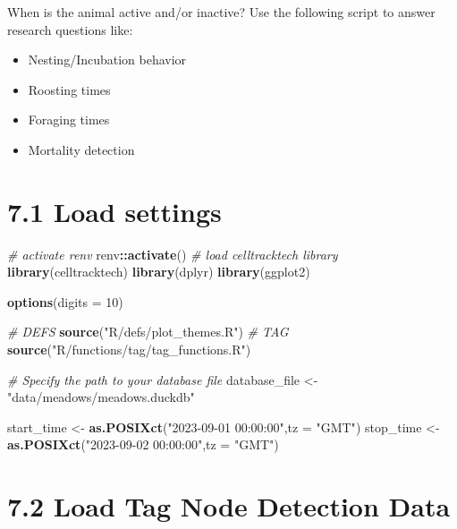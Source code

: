 \documentclass[
]{book}
\newenvironment{Shaded}{\begin{snugshade}}{\end{snugshade}}
\newcommand{\AttributeTok}[1]{\textcolor[rgb]{0.13,0.29,0.53}{#1}}
\newcommand{\CommentTok}[1]{\textcolor[rgb]{0.56,0.35,0.01}{\textit{#1}}}
\newcommand{\DecValTok}[1]{\textcolor[rgb]{0.00,0.00,0.81}{#1}}
\newcommand{\FunctionTok}[1]{\textcolor[rgb]{0.13,0.29,0.53}{\textbf{#1}}}
\newcommand{\NormalTok}[1]{#1}
\newcommand{\OtherTok}[1]{\textcolor[rgb]{0.56,0.35,0.01}{#1}}
\newcommand{\SpecialCharTok}[1]{\textcolor[rgb]{0.81,0.36,0.00}{\textbf{#1}}}
\newcommand{\StringTok}[1]{\textcolor[rgb]{0.31,0.60,0.02}{#1}}
\providecommand{\tightlist}{%
  \setlength{\itemsep}{0pt}\setlength{\parskip}{0pt}}
\begin{document}
When is the animal active and/or inactive? Use the following script to answer research questions like:

\begin{itemize}
\tightlist
\item
  Nesting/Incubation behavior
\item
  Roosting times
\item
  Foraging times
\item
  Mortality detection
\end{itemize}

\section{7.1 Load settings}\label{load-settings-1}

\begin{Shaded}
\begin{Highlighting}[]
\CommentTok{\# activate renv}
\NormalTok{renv}\SpecialCharTok{::}\FunctionTok{activate}\NormalTok{()}
\CommentTok{\# load celltracktech library}
\FunctionTok{library}\NormalTok{(celltracktech)}
\FunctionTok{library}\NormalTok{(dplyr)}
\FunctionTok{library}\NormalTok{(ggplot2)}

\FunctionTok{options}\NormalTok{(}\AttributeTok{digits =} \DecValTok{10}\NormalTok{)}

\CommentTok{\# DEFS}
\FunctionTok{source}\NormalTok{(}\StringTok{"R/defs/plot\_themes.R"}\NormalTok{)}
\CommentTok{\# TAG}
\FunctionTok{source}\NormalTok{(}\StringTok{"R/functions/tag/tag\_functions.R"}\NormalTok{)}

\CommentTok{\# Specify the path to your database file}
\NormalTok{database\_file }\OtherTok{\textless{}{-}} \StringTok{"data/meadows/meadows.duckdb"}

\NormalTok{start\_time }\OtherTok{\textless{}{-}} \FunctionTok{as.POSIXct}\NormalTok{(}\StringTok{"2023{-}09{-}01 00:00:00"}\NormalTok{,}\AttributeTok{tz =} \StringTok{"GMT"}\NormalTok{)}
\NormalTok{stop\_time }\OtherTok{\textless{}{-}} \FunctionTok{as.POSIXct}\NormalTok{(}\StringTok{"2023{-}09{-}02 00:00:00"}\NormalTok{,}\AttributeTok{tz =} \StringTok{"GMT"}\NormalTok{)}
\end{Highlighting}
\end{Shaded}

\section{7.2 Load Tag Node Detection Data}\label{load-tag-node-detection-data}
\end{document}
